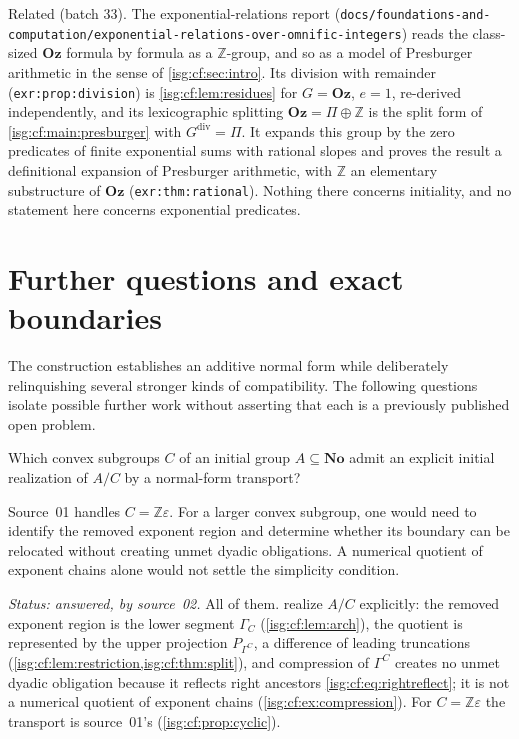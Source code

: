 \documentclass[11pt]{article}
\theoremstyle{definition}
\theoremstyle{remark}
\newcommand{\No}{\ensuremath{\mathbf{No}}}
\newcommand{\Oz}{\ensuremath{\mathbf{Oz}}}
\newcommand{\Z}{\mathbb{Z}}
\newcommand{\dv}{\mathrm{div}}
\newcommand{\replabel}[1]{\nolinkurl{#1}}
\begin{document}
Related (batch 33). The exponential-relations report
(\nolinkurl{docs/foundations-and-computation/exponential-relations-over-omnific-integers})
reads the class-sized
$\Oz$ formula by formula as a $\Z$-group, and so as a model of Presburger
arithmetic in the sense of \cref{isg:cf:sec:intro}. Its division with
remainder (\replabel{exr:prop:division}) is \cref{isg:cf:lem:residues} for
$G=\Oz$, $e=1$, re-derived independently, and its lexicographic splitting
$\Oz=\Pi\oplus\Z$ is the split form of \cref{isg:cf:main:presburger} with
$G^{\dv}=\Pi$. It expands this group by the zero predicates of finite
exponential sums with rational slopes and proves the result a definitional
expansion of Presburger arithmetic, with $\Z$ an elementary substructure of
$\Oz$ (\replabel{exr:thm:rational}). Nothing there concerns initiality, and
no statement here concerns exponential predicates.

\section{Further questions and exact boundaries}\label{isg:sec:further}

The construction establishes an additive normal form while deliberately
relinquishing several stronger kinds of compatibility. The following
questions isolate possible further work without asserting that each is
a previously published open problem.

\begin{question}\label{isg:q:convex}
Which convex subgroups $C$ of an initial group $A\subseteq\No$ admit
an explicit initial realization of $A/C$ by a normal-form transport?
\end{question}
Source~01 handles $C=\Z\varepsilon$. For a larger convex subgroup,
one would need to identify the removed exponent region and determine
whether its boundary can be relocated without creating unmet dyadic
obligations. A numerical quotient of exponent chains alone would not
settle the simplicity condition.

\emph{Status: answered, by source~02.} All of them.
 realize $A/C$ explicitly:
the removed exponent region is the lower segment $\Gamma_C$
(\cref{isg:cf:lem:arch}), the quotient is represented by the upper
projection $P_{\Gamma^C}$, a difference of leading truncations
(\cref{isg:cf:lem:restriction,isg:cf:thm:split}), and compression of
$\Gamma^C$ creates no unmet dyadic obligation because it reflects right
ancestors \eqref{isg:cf:eq:rightreflect}; it is not a numerical quotient
of exponent chains (\cref{isg:cf:ex:compression}). For
$C=\Z\varepsilon$ the transport is source~01's
(\cref{isg:cf:prop:cyclic}).
\end{document}
